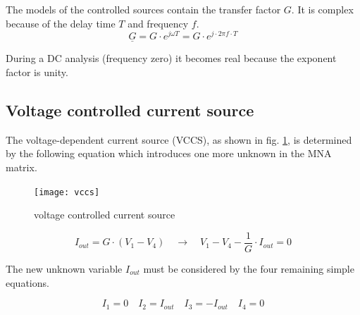 The models of the controlled sources contain the transfer factor $G$.
It is complex because of the delay time $T$ and frequency $f$.
\begin{equation}
\underline{G} = G\cdot e^{j\omega T} = G\cdot e^{j\cdot 2\pi f\cdot T}
\end{equation}

During a DC analysis (frequency zero) it becomes real because the
exponent factor is unity.


\subsection{Voltage controlled current source}
\label{sec:vccs}

The voltage-dependent current source (VCCS), as shown in fig.
\ref{fig:vccs}, is determined by the following equation which
introduces one more unknown in the MNA matrix.

\begin{figure}[ht]
\begin{center}
\texttt{[image: vccs]}
\end{center}
\caption{voltage controlled current source}
\label{fig:vccs}
\end{figure}
\FloatBarrier

\begin{equation}
I_{out} = G\cdot\left(V_{1} - V_{4}\right)
\quad \rightarrow \quad
V_{1} - V_{4} - \frac{1}{G}\cdot I_{out} = 0
\label{eq:vccs}
\end{equation}

The new unknown variable $I_{out}$ must be considered by the four
remaining simple equations.

\begin{equation}
I_{1} = 0 \quad I_{2} = I_{out} \quad I_{3} = -I_{out} \quad I_{4} = 0
\end{equation}

